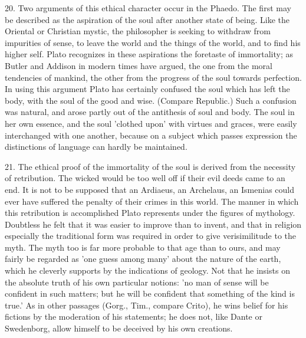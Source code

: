 20. Two arguments of this ethical character occur in the Phaedo. The
first may be described as the aspiration of the soul after another state
of being. Like the Oriental or Christian mystic, the philosopher is
seeking to withdraw from impurities of sense, to leave the world and the
things of the world, and to find his higher self. Plato recognizes in
these aspirations the foretaste of immortality; as Butler and Addison in
modern times have argued, the one from the moral tendencies of mankind,
the other from the progress of the soul towards perfection. In using
this argument Plato has certainly confused the soul which has left the
body, with the soul of the good and wise. (Compare Republic.) Such a
confusion was natural, and arose partly out of the antithesis of soul
and body. The soul in her own essence, and the soul 'clothed upon' with
virtues and graces, were easily interchanged with one another, because
on a subject which passes expression the distinctions of language can
hardly be maintained.

21. The ethical proof of the immortality of the soul is derived from the
necessity of retribution. The wicked would be too well off if their
evil deeds came to an end. It is not to be supposed that an Ardiaeus,
an Archelaus, an Ismenias could ever have suffered the penalty of
their crimes in this world. The manner in which this retribution is
accomplished Plato represents under the figures of mythology. Doubtless
he felt that it was easier to improve than to invent, and that in
religion especially the traditional form was required in order to give
verisimilitude to the myth. The myth too is far more probable to that
age than to ours, and may fairly be regarded as 'one guess among
many' about the nature of the earth, which he cleverly supports by the
indications of geology. Not that he insists on the absolute truth of
his own particular notions: 'no man of sense will be confident in such
matters; but he will be confident that something of the kind is true.'
As in other passages (Gorg., Tim., compare Crito), he wins belief for
his fictions by the moderation of his statements; he does not, like
Dante or Swedenborg, allow himself to be deceived by his own creations.

